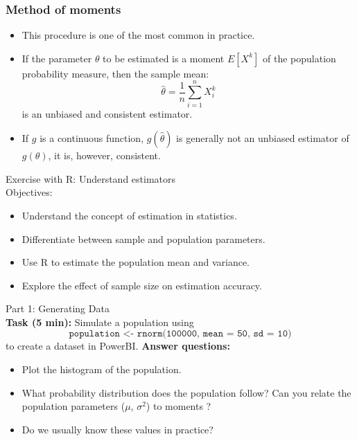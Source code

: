 \documentclass[main.tex]{subfiles}
\begin{document}
\begin{frame}
    \frametitle{Method of moments}
\begin{itemize}
    \item<+-> This procedure is one of the most common in practice.
    \item<+-> If the parameter $\theta$ to be estimated is a moment $E\left[ X^k \right]$ of the population probability measure, then
    the sample mean:
    \begin{equation}
        \hat{\theta} = \frac{1}{n} \sum_{i=1}^n X_i^k
    \end{equation}
    is an unbiased and consistent estimator.
    \item<+-> If $g$ is a continuous function, $g\left(\hat{\theta}\right)$ is generally not an unbiased estimator of $g\left( \theta \right)$, it is, 
    however, consistent.
\end{itemize}
\end{frame}

\begin{frame}
\begin{block}{Exercise with R: Understand estimators\\}
Objectives:
\begin{itemize}
  \item Understand the concept of estimation in statistics.
  \item Differentiate between sample and population parameters.
  \item Use R to estimate the population mean and variance.
  \item Explore the effect of sample size on estimation accuracy.
\end{itemize}
\end{block}
\end{frame}


\begin{frame}
\begin{block}{Part 1: Generating Data\\}
\textbf{Task (5 min):} Simulate a population using $$\texttt{population <- rnorm(100000, mean = 50, sd = 10)}$$
to create a dataset in PowerBI.
\textbf{Answer questions:}
\begin{itemize}
  \item<+-> Plot the histogram of the population.
  \item<+-> What probability distribution does the population follow? Can you relate the population parameters ($\mu$, $\sigma^2$) to moments ?
  \item<+-> Do we usually know these values in practice?
\end{itemize}
\end{block}
\end{frame}
\end{document}
